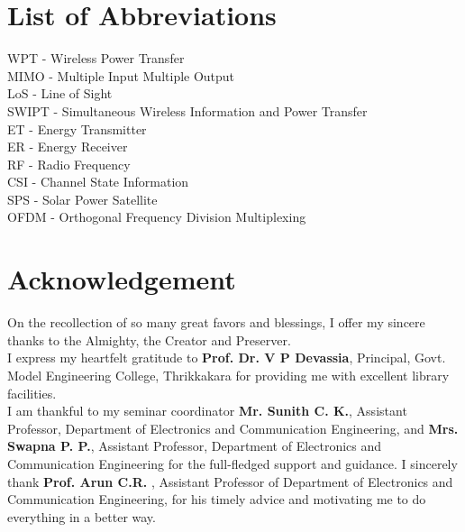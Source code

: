 \documentclass[hidelinks, 12pt]{report}
\begin{document}
\section*{List of Abbreviations}
\begin{flushleft}
WPT -  Wireless Power Transfer\\ 
\vspace{0.5cm}
MIMO - Multiple Input Multiple Output\\
\vspace{0.5cm}
LoS - Line of Sight\\
\vspace{0.5cm}
SWIPT - Simultaneous Wireless Information and Power Transfer\\
\vspace{0.5cm}
ET - Energy Transmitter\\
\vspace{0.5cm}
ER - Energy Receiver\\
\vspace{0.5cm}
RF - Radio Frequency\\
\vspace{0.5cm}
CSI - Channel State Information\\
\vspace{0.5cm}
SPS - Solar Power Satellite\\
\vspace{0.5cm}
OFDM - Orthogonal Frequency Division Multiplexing\\
\end{flushleft}
\pagebreak

\section*{Acknowledgement}
\justify
On the recollection of so many great favors and blessings, I offer my sincere thanks to the Almighty, the Creator and Preserver.\\

I express my heartfelt gratitude to \textbf{Prof. Dr. V P Devassia}, Principal, Govt. Model Engineering College, Thrikkakara for providing me with excellent library facilities. \\
I am thankful to my seminar coordinator \textbf{Mr. Sunith C. K.}, Assistant Professor, Department of Electronics and Communication Engineering, and \textbf{Mrs. Swapna P. P.}, Assistant Professor, Department of Electronics and Communication Engineering for the full-fledged support and guidance. I sincerely thank \textbf{Prof. Arun C.R.} , Assistant Professor of Department of Electronics and Communication Engineering, for his timely advice and motivating me to do everything in a better way.\\
\end{document}
